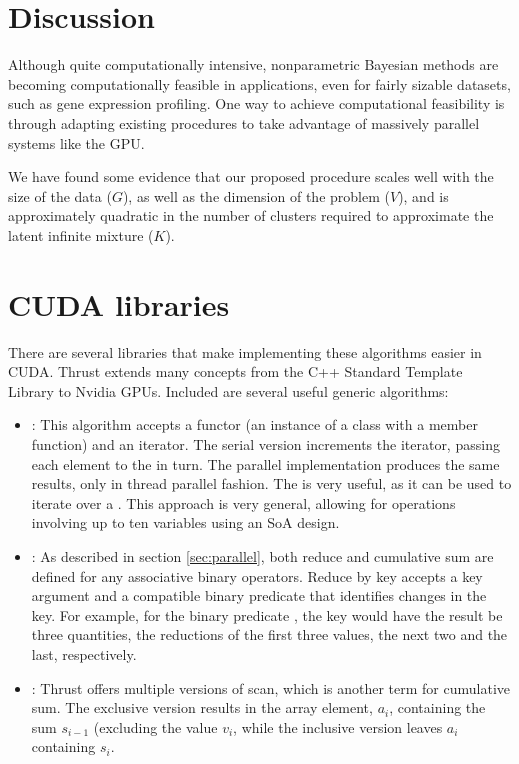 {\section{Discussion}
\label{sec:discussion}
Although quite computationally intensive, nonparametric Bayesian methods are becoming computationally feasible in applications, even for fairly sizable datasets, such as gene expression profiling. One way to achieve computational feasibility is through adapting existing procedures to take advantage of massively parallel systems like the GPU.

We have found some evidence that our proposed procedure scales well with the size of the data ($G$), as well as the dimension of the problem ($V$), and is approximately quadratic in the number of clusters required to approximate the latent infinite mixture ($K$).

\appendix
\section{CUDA libraries}
There are several libraries that make implementing these algorithms easier in CUDA. Thrust \citep{thrust} extends many concepts from the C++ Standard Template Library to Nvidia GPUs. Included are several useful generic algorithms:
\begin{itemize}
\item {}: This algorithm accepts a functor (an
  instance of a class with a member  function)
  and an iterator. The serial version increments the iterator, passing
  each element to the  in turn. The parallel implementation
  produces the same results, only in thread parallel fashion. The
   is very useful, as it can be used
  to iterate
  over a . This approach is very general, allowing
  for operations involving up to ten variables using an SoA
  design.

\item {}: As described in section
  \ref{sec:parallel}, both reduce and cumulative sum are defined for any associative binary operators. Reduce by key accepts a key argument and a compatible binary predicate that identifies changes in the key. For example, for the binary predicate , the key  would have the result be three quantities, the reductions of the first three values, the next two and the last, respectively.

\item {}: Thrust
  offers multiple versions of scan, which is another term for cumulative sum. The exclusive
  version results in the array element, $a_i$, containing the sum $s_{i-1}$ (excluding the value $v_i$, while the inclusive version leaves $a_i$ containing $s_i$.
\end{itemize}

}
